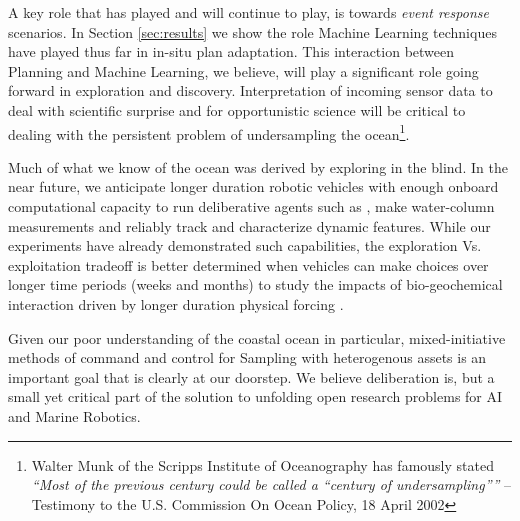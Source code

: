 A key role that \rx has played and will continue to play, is towards
\emph{event response} scenarios. In Section \ref{sec:results} we show
the role Machine Learning techniques have played thus far in in-situ
plan adaptation. This interaction between Planning and Machine
Learning, we believe, will play a significant role going forward in
exploration and discovery. Interpretation of incoming sensor data to
deal with scientific surprise and  for
opportunistic science will be critical to dealing with the persistent
problem of undersampling the ocean\footnote{Walter Munk of the Scripps
  Institute of Oceanography has famously stated \emph{``Most of the
    previous century could be called a “century of undersampling”''}
  -- Testimony to the U.S. Commission On Ocean Policy, 18 April
  2002}. 

Much of what we know of the ocean was derived by exploring in the
blind. In the near future, we anticipate longer duration robotic
vehicles with enough onboard computational capacity to run
deliberative agents such as \rxe, make water-column measurements and
reliably track and characterize dynamic features. While our
 experiments have already demonstrated such
capabilities, the exploration Vs. exploitation tradeoff is better
determined when vehicles can make choices over longer time periods
(weeks and months) to study the impacts of bio-geochemical interaction
driven by longer duration physical forcing .

Given our poor understanding of the coastal ocean in particular,
mixed-initiative methods of command and control for Sampling with
heterogenous assets is an important goal that is clearly at our
doorstep. We believe deliberation is, but a small yet critical part of
the solution to unfolding open research problems for AI and Marine
Robotics.
